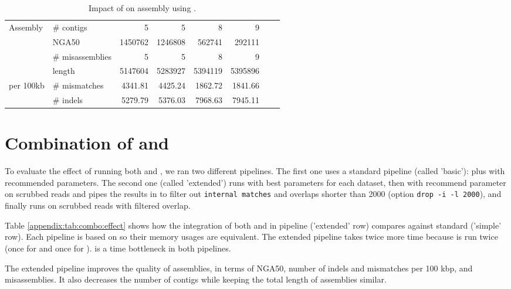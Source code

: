 \documentclass[./main.tex]{subfiles}
\begin{document}
\begin{table}[ht]
\begin{tabular}{ll|rr|rr|rr|}
 Assembly  &  \# contigs  & 5 & 5 & 8 &  9 &  & \\
  &  NGA50  & 1450762 & 1246808 & 562741 &  292111 &  & \\
  &  \# misassemblies  & 5 & 5 & 8 &  9 &  & \\
  &  length  & 5147604 & 5283927 & 5394119 &  5395896 &  & \\ \hline
per 100kb  &  \# mismatches  & 4341.81 & 4425.24 & 1862.72 &  1841.66 &  & \\
  &  \# indels  & 5279.79 & 5376.03 & 7968.63 &  7945.11 &  & \\
    \end{tabular}
    \caption{Impact of \fpa on assembly using \miniasm.}
    \label{appendix:tab:fpa:effect}
\end{table}



\newpage
\section{Combination of \yacrd and \fpa}\label{appendix:sec:combo}

To evaluate the effect of running both \yacrd and \fpa, we ran two different pipelines. The first one uses a  standard \miniasm pipeline (called 'basic'): \minimap plus \miniasm with recommended parameters. The second one (called 'extended') runs \yacrd with best parameters for each dataset, then \minimap with recommend parameter on scrubbed reads and pipes the results in \fpa to filter out \texttt{internal matches} and overlaps shorter than 2000 (option \texttt{drop -i -l 2000}), and finally runs \miniasm on scrubbed reads with filtered overlap. 

Table \ref{appendix:tab:combo:effect} shows how the integration of both \yacrd and \fpa in \miniasm pipeline ('extended' row) compares against standard \miniasm ('simple' row). Each pipeline is based on \minimap so their memory usages are equivalent. The extended pipeline takes twice more time because \minimap is run twice (once for \yacrd and once for \miniasm). \minimap is a time bottleneck in both pipelines. 

The extended pipeline improves the quality of assemblies, in terms of NGA50, number of indels and mismatches per 100 kbp, and misassemblies. It also decreases the number of contigs while keeping the total length of assemblies similar.
\end{document}
